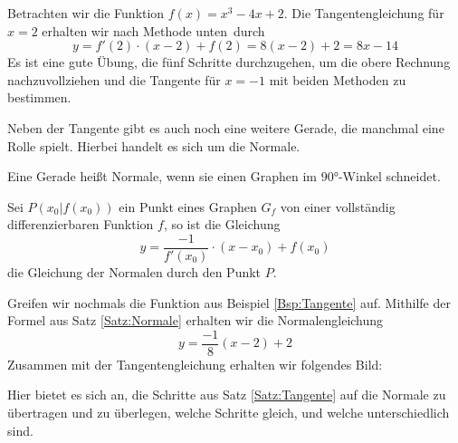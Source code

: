 \documentclass[ngerman, 12pt]{nssheetxea}
\begin{document}
\begin{example}
Betrachten wir die Funktion $f(x)= x^3-4x+2$. Die Tangentengleichung für $x=2$ erhalten wir nach Methode \glqq unten\grqq \ durch
\[ y=f'(2) \cdot (x-2) + f(2) = 8 (x-2) + 2 = 8x -14  \]
Es ist eine gute Übung, die fünf Schritte durchzugehen, um die obere Rechnung nachzuvollziehen und die Tangente für $x=-1$ mit beiden Methoden zu bestimmen.
\label{Bsp:Tangente}
\end{example}

Neben der Tangente gibt es auch noch eine weitere Gerade, die manchmal eine Rolle spielt. Hierbei handelt es sich um die Normale.

\begin{definition}
Eine Gerade heißt Normale, wenn sie einen Graphen im $\ang{90}$-Winkel schneidet.
\end{definition}

\begin{theorem}
Sei $P(x_0|f(x_0))$ ein Punkt eines Graphen $G_f$ von einer vollständig differenzierbaren Funktion $f$, so ist die Gleichung
\[ y=\frac{-1}{f'(x_0)}\cdot (x-x_0) + f(x_0)\]
die Gleichung der Normalen durch den Punkt $P$.
\label{Satz:Normale}
\end{theorem}

\begin{example}
Greifen wir nochmals die Funktion aus Beispiel \ref{Bsp:Tangente} auf. Mithilfe der Formel aus Satz \ref{Satz:Normale} erhalten wir die Normalengleichung
\[ y=\dfrac{-1}{8}(x-2)+2  \]
Zusammen mit der Tangentengleichung erhalten wir folgendes Bild:
\begin{center}
\end{center}
Hier bietet es sich an, die Schritte aus Satz \ref{Satz:Tangente} auf die Normale zu übertragen und zu überlegen, welche Schritte gleich, und welche unterschiedlich sind.
\end{example}
\end{document}
